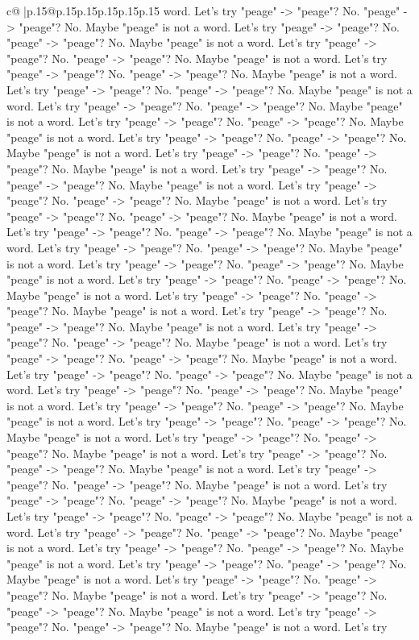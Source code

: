 \documentclass{article}
\begin{document}
{\begin{supertabular}{c@{$\;$}|p{.15\linewidth}@{}p{.15\linewidth}p{.15\linewidth}p{.15\linewidth}p{.15\linewidth}p{.15\linewidth}}
{{{word. Let's try "peage" {-}> "peage"? No. "peage" {-}> "peage"? No. Maybe "peage" is not a word. Let's try "peage" {-}> "peage"? No. "peage" {-}> "peage"? No. Maybe "peage" is not a word. Let's try "peage" {-}> "peage"? No. "peage" {-}> "peage"? No. Maybe "peage" is not a word. Let's try "peage" {-}> "peage"? No. "peage" {-}> "peage"? No. Maybe "peage" is not a word. Let's try "peage" {-}> "peage"? No. "peage" {-}> "peage"? No. Maybe "peage" is not a word. Let's try "peage" {-}> "peage"? No. "peage" {-}> "peage"? No. Maybe "peage" is not a word. Let's try "peage" {-}> "peage"? No. "peage" {-}> "peage"? No. Maybe "peage" is not a word. Let's try "peage" {-}> "peage"? No. "peage" {-}> "peage"? No. Maybe "peage" is not a word. Let's try "peage" {-}> "peage"? No. "peage" {-}> "peage"? No. Maybe "peage" is not a word. Let's try "peage" {-}> "peage"? No. "peage" {-}> "peage"? No. Maybe "peage" is not a word. Let's try "peage" {-}> "peage"? No. "peage" {-}> "peage"? No. Maybe "peage" is not a word. Let's try "peage" {-}> "peage"? No. "peage" {-}> "peage"? No. Maybe "peage" is not a word. Let's try "peage" {-}> "peage"? No. "peage" {-}> "peage"? No. Maybe "peage" is not a word. Let's try "peage" {-}> "peage"? No. "peage" {-}> "peage"? No. Maybe "peage" is not a word. Let's try "peage" {-}> "peage"? No. "peage" {-}> "peage"? No. Maybe "peage" is not a word. Let's try "peage" {-}> "peage"? No. "peage" {-}> "peage"? No. Maybe "peage" is not a word. Let's try "peage" {-}> "peage"? No. "peage" {-}> "peage"? No. Maybe "peage" is not a word. Let's try "peage" {-}> "peage"? No. "peage" {-}> "peage"? No. Maybe "peage" is not a word. Let's try "peage" {-}> "peage"? No. "peage" {-}> "peage"? No. Maybe "peage" is not a word. Let's try "peage" {-}> "peage"? No. "peage" {-}> "peage"? No. Maybe "peage" is not a word. Let's try "peage" {-}> "peage"? No. "peage" {-}> "peage"? No. Maybe "peage" is not a word. Let's try "peage" {-}> "peage"? No. "peage" {-}> "peage"? No. Maybe "peage" is not a word. Let's try "peage" {-}> "peage"? No. "peage" {-}> "peage"? No. Maybe "peage" is not a word. Let's try "peage" {-}> "peage"? No. "peage" {-}> "peage"? No. Maybe "peage" is not a word. Let's try "peage" {-}> "peage"? No. "peage" {-}> "peage"? No. Maybe "peage" is not a word. Let's try "peage" {-}> "peage"? No. "peage" {-}> "peage"? No. Maybe "peage" is not a word. Let's try "peage" {-}> "peage"? No. "peage" {-}> "peage"? No. Maybe "peage" is not a word. Let's try "peage" {-}> "peage"? No. "peage" {-}> "peage"? No. Maybe "peage" is not a word. Let's try "peage" {-}> "peage"? No. "peage" {-}> "peage"? No. Maybe "peage" is not a word. Let's try "peage" {-}> "peage"? No. "peage" {-}> "peage"? No. Maybe "peage" is not a word. Let's try "peage" {-}> "peage"? No. "peage" {-}> "peage"? No. Maybe "peage" is not a word. Let's try "peage" {-}> "peage"? No. "peage" {-}> "peage"? No. Maybe "peage" is not a word. Let's try "peage" {-}> "peage"? No. "peage" {-}> "peage"? No. Maybe "peage" is not a word. Let's try "peage" {-}> "peage"? No. "peage" {-}> "peage"? No. Maybe "peage" is not a word. Let's try "peage" {-}> "peage"? No. "peage" {-}> "peage"? No. Maybe "peage" is not a word. Let's try }}}
\end{supertabular}}
\end{document}
